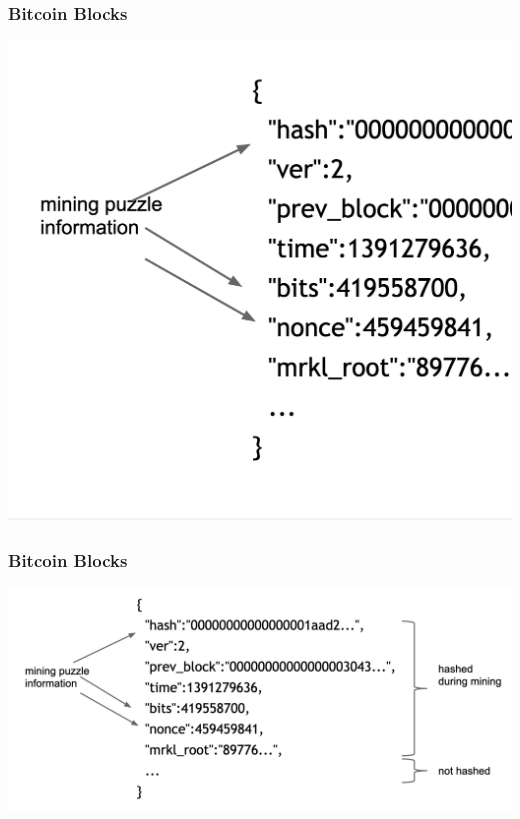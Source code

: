 \documentclass{beamer}
\begin{document}
\begin{frame}
  \frametitle{Bitcoin Blocks}
  
  \centering
	\includegraphics[scale=0.3]{block2}
  
\end{frame}
\begin{frame}
  \frametitle{Bitcoin Blocks}
  
  \centering
	\includegraphics[scale=0.28]{block3}
  
\end{frame}


\end{document}
